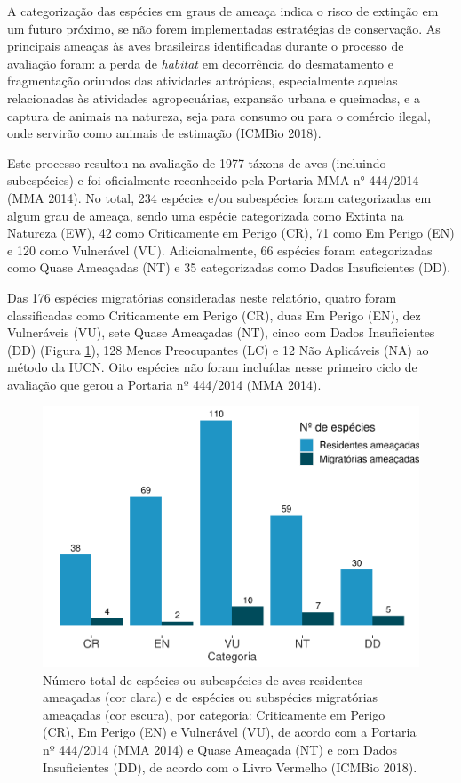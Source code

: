 \documentclass[
  oneside]{scrbook}
\begin{document}
A categorização das espécies em graus de ameaça indica o risco de extinção em um futuro próximo, se não forem implementadas estratégias de conservação. As principais ameaças às aves brasileiras identificadas durante o processo de avaliação foram: a perda de \emph{habitat} em decorrência do desmatamento e fragmentação oriundos das atividades antrópicas, especialmente aquelas relacionadas às atividades agropecuárias, expansão urbana e queimadas, e a captura de animais na natureza, seja para consumo ou para o comércio ilegal, onde servirão como animais de estimação (ICMBio 2018).

Este processo resultou na avaliação de 1977 táxons de aves (incluindo subespécies) e foi oficialmente reconhecido pela Portaria MMA n° 444/2014 (MMA 2014). No total, 234 espécies e/ou subespécies foram categorizadas em algum grau de ameaça, sendo uma espécie categorizada como Extinta na Natureza (EW), 42 como Criticamente em Perigo (CR), 71 como Em Perigo (EN) e 120 como Vulnerável (VU). Adicionalmente, 66 espécies foram categorizadas como Quase Ameaçadas (NT) e 35 categorizadas como Dados Insuficientes (DD).

Das 176 espécies migratórias consideradas neste relatório, quatro foram classificadas como Criticamente em Perigo (CR), duas Em Perigo (EN), dez Vulneráveis (VU), sete Quase Ameaçadas (NT), cinco com Dados Insuficientes (DD) (Figura \ref{fig:09}), 128 Menos Preocupantes (LC) e 12 Não Aplicáveis (NA) ao método da IUCN. Oito espécies não foram incluídas nesse primeiro ciclo de avaliação que gerou a Portaria nº 444/2014 (MMA 2014).

\begin{figure}[H]

{\centering \includegraphics[width=0.65\linewidth]{04-cap03_files/figure-latex/09-1} 

}

\caption{Número total de espécies ou subespécies de aves residentes ameaçadas (cor clara) e de espécies ou subspécies migratórias ameaçadas (cor escura), por categoria: Criticamente em Perigo (CR), Em Perigo (EN) e Vulnerável (VU), de acordo com a Portaria nº 444/2014 (MMA 2014) e Quase Ameaçada (NT) e com Dados Insuficientes (DD), de acordo com o Livro Vermelho (ICMBio 2018).}\label{fig:09}
\end{figure}
\end{document}
